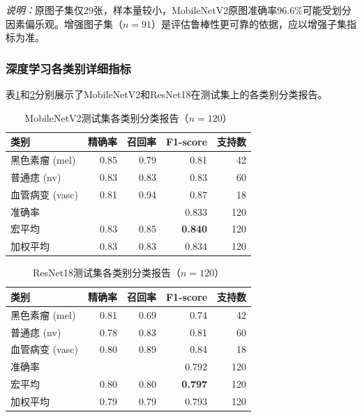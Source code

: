 \documentclass[UTF8,a4paper,12pt]{ctexart}
\numberwithin{figure}{section}
\numberwithin{table}{section}
\begin{document}
\textit{说明：}原图子集仅29张，样本量较小，MobileNetV2原图准确率96.6\%可能受划分因素偏乐观。增强图子集（$n=91$）是评估鲁棒性更可靠的依据，应以增强子集指标为准。

\subsubsection{深度学习各类别详细指标}

表\ref{tab:dl_perclass}和\ref{tab:dl_perclass_rn}分别展示了MobileNetV2和ResNet18在测试集上的各类别分类报告。

\begin{table}[H]
\centering
\caption{MobileNetV2测试集各类别分类报告（$n=120$）}
\label{tab:dl_perclass}
\begin{tabular}{lrrrr}
\toprule
\textbf{类别} & \textbf{精确率} & \textbf{召回率} & \textbf{F1-score} & \textbf{支持数} \\
\midrule
黑色素瘤 (mel)  & 0.85 & 0.79 & 0.81 & 42 \\
普通痣 (nv)     & 0.83 & 0.83 & 0.83 & 60 \\
血管病变 (vasc) & 0.81 & 0.94 & 0.87 & 18 \\
\midrule
准确率 & \multicolumn{3}{r}{0.833} & 120 \\
宏平均 & 0.83 & 0.85 & \textbf{0.840} & 120 \\
加权平均 & 0.83 & 0.83 & 0.834 & 120 \\
\bottomrule
\end{tabular}
\end{table}

\begin{table}[H]
\centering
\caption{ResNet18测试集各类别分类报告（$n=120$）}
\label{tab:dl_perclass_rn}
\begin{tabular}{lrrrr}
\toprule
\textbf{类别} & \textbf{精确率} & \textbf{召回率} & \textbf{F1-score} & \textbf{支持数} \\
\midrule
黑色素瘤 (mel)  & 0.81 & 0.69 & 0.74 & 42 \\
普通痣 (nv)     & 0.78 & 0.83 & 0.81 & 60 \\
血管病变 (vasc) & 0.80 & 0.89 & 0.84 & 18 \\
\midrule
准确率 & \multicolumn{3}{r}{0.792} & 120 \\
宏平均 & 0.80 & 0.80 & \textbf{0.797} & 120 \\
加权平均 & 0.79 & 0.79 & 0.793 & 120 \\
\bottomrule
\end{tabular}
\end{table}
\end{document}
